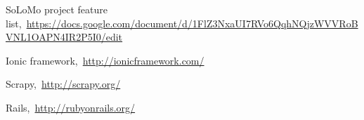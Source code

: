 \cleardoublepage
{}
{}
\begin{thebibliography}{99}

SoLoMo project feature list,\ \url{https://docs.google.com/document/d/1FlZ3NxaUI7RVo6QqhNQjzWVVRoBVNL1OAPN4IR2P5I0/edit}

Ionic framework,\ \url{http://ionicframework.com/}

Scrapy,\ \url{http://scrapy.org/}

Rails,\ \url{http://rubyonrails.org/}

\end{thebibliography}
